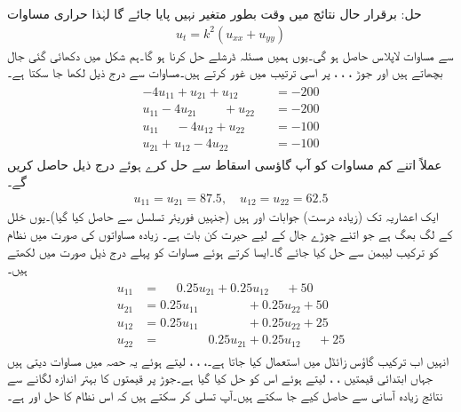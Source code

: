 حل:\quad
برقرار حال نتائج میں وقت بطور متغیر نہیں پایا جائے گا لہٰذا حراری مساوات
\begin{align*}
u_t=k^2(u_{xx}+u_{yy})
\end{align*}
سے مساوات لاپلاس حاصل ہو گی۔یوں ہمیں مسئلہ ڈرشلے حل کرنا ہو گا۔ہم شکل میں دکھائی گئی جال بچھاتے ہیں اور جوڑ ، ، ،  پر اسی ترتیب میں غور کرتے ہیں۔مساوات  سے درج ذیل لکھا جا سکتا ہے۔
\begin{gather}
\begin{aligned}\label{مساوات_اعدادی_نظام_لیبمن_الف}
-4u_{11}+u_{21}+u_{12}\phantom{+u_{13}}&=-200\\
u_{11}-4u_{21}\phantom{+u_{23}}+u_{22}&=-200\\
u_{11}\phantom{u_{22}}-4u_{12}+u_{22}&=-100\\
u_{21}+u_{12}-4u_{22}&=-100
\end{aligned}
\end{gather}
عملاً اتنے کم مساوات کو آپ گاؤسی اسقاط سے حل کرے ہوئے درج ذیل حاصل کریں گے۔
\begin{align*}
u_{11}=u_{21}=87.5,\quad u_{12}=u_{22}=62.5
\end{align*}
ایک اعشاریہ  تک (زیادہ درست) جوابات  اور  ہیں (جنہیں فوریئر تسلسل سے حاصل کیا گیا)۔یوں خلل  کے لگ بھگ ہے جو اتنے چوڑے جال کے لیے حیرت کن بات ہے۔ زیادہ مساواتوں کی صورت میں نظام کو ترکیب لیبمن سے حل کیا جائے گا۔ایسا کرتے ہوئے مساوات  کو پہلے درج ذیل صورت میں لکھتے ہیں۔
\begin{gather}
\begin{aligned}\label{مساوات_اعدادی_نظام_لیبمن_ب}
u_{11}&=\phantom{u_{23}}0.25u_{21}+0.25u_{12}\phantom{u_{32}}+50\\
u_{21}&=0.25u_{11}\phantom{u_{23}+u_{32}}+0.25u_{22}+50\\
u_{12}&=0.25u_{11}\phantom{u_{23}+u_{21}}+0.25u_{22}+25\\
u_{22}&=\phantom{u_{12}+u_{23}}0.25u_{21}+0.25u_{12}\phantom{u_{21}}+25
\end{aligned}
\end{gather} 
انہیں اب ترکیب گاؤس زائڈل میں استعمال کیا جاتا ہے۔، ، ،  لیتے ہوئے یہ  حصہ   میں مساوات دیتی ہیں جہاں ابتدائی قیمتیں ، ،  لیتے ہوئے اس کو  حل کیا گیا ہے۔جوڑ پر قیمتوں کا بہتر اندازہ لگانے سے نتائج زیادہ آسانی سے حاصل کیے جا سکتے ہیں۔آپ تسلی کر سکتے ہیں کہ اس نظام کا حل  اور  ہے۔

